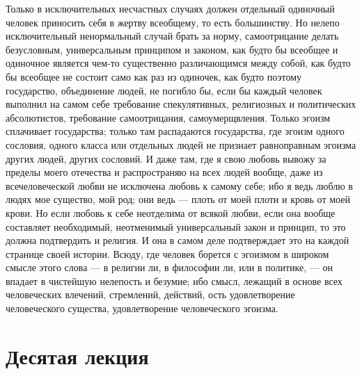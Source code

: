 \documentclass[12pt]{article}
\begin{document}
Только в исключительных несчастных случаях должен отдельный одиночный человек приносить себя в жертву всеобщему, то есть большинству. Но нелепо исключительный ненормальный случай брать за норму, самоотрицание делать безусловным, универсальным принципом и законом, как будто бы всеобщее и одиночное является чем-то существенно различающимся между собой, как будто бы всеобщее не состоит само как раз из одиночек, как будто поэтому государство, объединение людей, не погибло бы, если бы каждый человек выполнил на самом себе требование спекулятивных, религиозных и политических абсолютистов, требование самоотрицания, самоумерщвления. Только эгоизм сплачивает государства; только там распадаются государства, где эгоизм одного сословия, одного класса или отдельных людей не признает равноправным эгоизма других людей, других сословий. И даже там, где я свою любовь вывожу за пределы моего отечества и распространяю на всех людей вообще, даже из всечеловеческой любви не исключена любовь к самому себе; ибо я ведь люблю в людях мое существо, мой род; они ведь --- плоть от моей плоти и кровь от моей крови. Но если любовь к себе неотделима от всякой любви, если она вообще составляет необходимый, неотменимый универсальный закон и принцип, то это должна подтвердить и религия. И она в самом деле подтверждает это на каждой странице своей истории. Всюду, где человек борется с эгоизмом в широком смысле этого слова --- в религии ли, в философии ли, или в политике, --- он впадает в чистейшую нелепость и безумие; ибо смысл, лежащий в основе всех человеческих влечений, стремлений, действий, ость удовлетворение человеческого существа, удовлетворение человеческого эгоизма. 

\section*{Десятая лекция}
\end{document}
